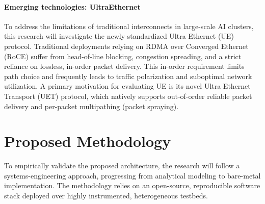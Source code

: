 \documentclass[11pt,a4paper]{article}
\begin{document}
\paragraph{Emerging technologies: UltraEthernet}
To address the limitations of traditional interconnects in large-scale AI clusters, this research will investigate the newly standardized Ultra Ethernet (UE)\cite{hoefler2025ultra} protocol. Traditional deployments relying on RDMA over Converged Ethernet (RoCE) suffer from head-of-line blocking, congestion spreading, and a strict reliance on lossless, in-order packet delivery\cite{guo2016rdma}. This in-order requirement limits path choice and frequently leads to traffic polarization and suboptimal network utilization. A primary motivation for evaluating UE is its novel Ultra Ethernet Transport (UET) protocol, which natively supports out-of-order reliable packet delivery and per-packet multipathing (packet spraying).

\section{Proposed Methodology}
\label{sec:methodology}
To empirically validate the proposed architecture, the research will follow a systems-engineering approach, progressing from analytical modeling to bare-metal implementation. The methodology relies on an open-source, reproducible software stack deployed over highly instrumented, heterogeneous testbeds.
\end{document}
